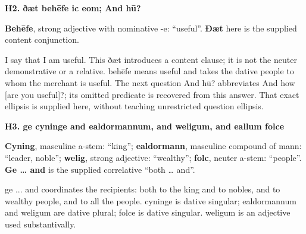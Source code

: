 \par\begin{minipage}{\linewidth}\raggedright
\textbf{H2. ðæt behēfe ic eom; And hū?}

\textbf{Behēfe}, strong adjective with nominative -e: “useful”. \textbf{Ðæt} here is the supplied content conjunction.

I say that I am useful. This ðæt introduces a content clause; it is not the neuter demonstrative or a relative. behēfe means useful and takes the dative people to whom the merchant is useful. The next question And hū? abbreviates And how [are you useful]?; its omitted predicate is recovered from this answer. That exact ellipsis is supplied here, without teaching unrestricted question ellipsis.

\end{minipage}\par\addvspace{4pt}

\par\begin{minipage}{\linewidth}\raggedright
\textbf{H3. ge cyninge and ealdormannum, and weligum, and eallum folce}

\textbf{Cyning}, masculine a-stem: “king”; \textbf{ealdormann}, masculine compound of mann: “leader, noble”; \textbf{welig}, strong adjective: “wealthy”; \textbf{folc}, neuter a-stem: “people”. \textbf{Ge … and} is the supplied correlative “both … and”.

ge ... and coordinates the recipients: both to the king and to nobles, and to wealthy people, and to all the people. cyninge is dative singular; ealdormannum and weligum are dative plural; folce is dative singular. weligum is an adjective used substantivally.

\end{minipage}\par\addvspace{4pt}

